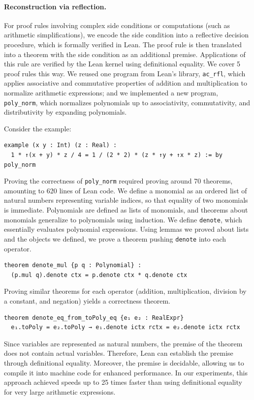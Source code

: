 \documentclass[runningheads]{llncs}
\begin{document}
\paragraph{Reconstruction via reflection.} For proof rules involving complex side conditions or computations (such as
arithmetic simplifications), we encode the side condition into a reflective
decision procedure, which is formally verified in Lean. The proof rule is then translated into a theorem with
the side condition as an additional premise. Applications of this rule are
verified by the Lean kernel using definitional equality.
%
We cover 5 proof rules this way. We reused one program from Lean's library,
\texttt{ac\_rfl}, which applies associative and commutative properties of
addition and multiplication to normalize arithmetic expressions; and we implemented
a new program, \texttt{poly\_norm}, which normalizes polynomials up to
associativity, commutativity, and distributivity by expanding polynomials.

\begin{example}

Consider the example:
\begin{lstlisting}
example (x y : Int) (z : Real) :
  1 * ↑(x + y) * z / 4 = 1 / (2 * 2) * (z * ↑y + ↑x * z) := by poly_norm
\end{lstlisting}
\end{example}

Proving the correctness of \texttt{poly\_norm} required proving around 70
theorems, amounting to 620 lines of Lean code.
%
We define a monomial as an ordered list of natural numbers representing variable indices, so that equality of two monomials is immediate.
%
Polynomials are defined as lists of monomials, and theorems about monomials generalize to polynomials using induction.
%
We define \lstinline{denote}, which essentially evaluates polynomial expressions.
Using lemmas we proved about lists and the objects we defined, we prove a theorem pushing \lstinline{denote} into each operator.
\begin{lstlisting}
theorem denote_mul {p q : Polynomial} :
  (p.mul q).denote ctx = p.denote ctx * q.denote ctx
\end{lstlisting}
%
Proving similar theorems for each operator (addition, multiplication, division by a constant, and negation) yields a correctness theorem.
\begin{lstlisting}
theorem denote_eq_from_toPoly_eq {e₁ e₂ : RealExpr}
  e₁.toPoly = e₂.toPoly → e₁.denote ictx rctx = e₂.denote ictx rctx
\end{lstlisting}
%
Since variables are represented as natural numbers, the premise of the theorem does not contain actual variables. Therefore, Lean can establish the premise through definitional equality. Moreover, the premise is decidable, allowing us to compile it into machine code for enhanced performance. In our experiments, this approach achieved speeds up to 25 times faster than using definitional equality for very large arithmetic expressions.
\end{document}

